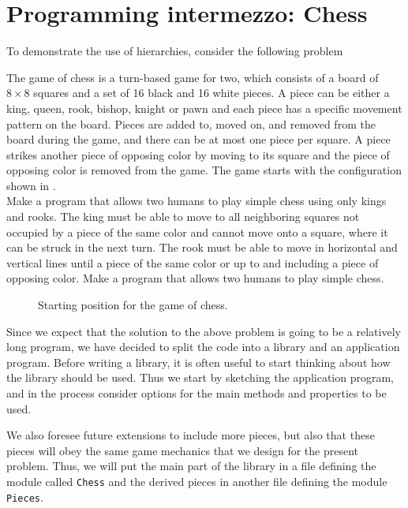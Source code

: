 \section{Programming intermezzo: Chess}
To demonstrate the use of hierarchies, consider the following problem
\begin{problem}
  The game of chess is a turn-based game for two, which consists of a board of $8\times 8$ squares and a set of 16 black and 16 white pieces. A piece can be either a king, queen, rook, bishop, knight or pawn and each piece has a specific movement pattern on the board. Pieces are added to, moved on, and removed from the board during the game, and there can be at most one piece per square. A piece strikes another piece of opposing color by moving to its square and the piece of opposing color is removed from the game. The game starts with the configuration shown in .\\[\parskip]

  Make a program that allows two humans to play simple chess using only kings and rooks. The king must be able to move to all neighboring squares not occupied by a piece of the same color and cannot move onto a square, where it can be struck in the next turn. The rook must be able to move in horizontal and vertical lines until a piece of the same color or up to and including a piece of opposing color. Make a program that allows two humans to play simple chess.
\end{problem}
\begin{figure}
  \centering
  \newgame
  \showboard
  \caption{Starting position for the game of chess.}
  \label{fig:chessNewGame}
\end{figure}
Since we expect that the solution to the above problem is going to be a relatively long program, we have decided to split the code into a library and an application program. Before writing a library, it is often useful to start thinking about how the library should be used. Thus we start by sketching the application program, and in the process consider options for the main methods and properties to be used.

We also foresee future extensions to include more pieces, but also that these pieces will obey the same game mechanics that we design for the present problem. Thus, we will put the main part of the library in a file defining the module called \lstinline{Chess} and the derived pieces in another file defining the module \lstinline{Pieces}.

